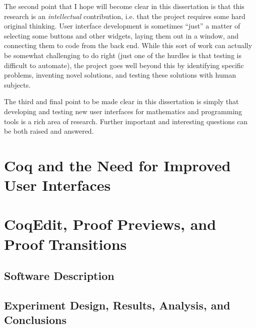 \documentclass[phd,appendix]{uithesis}
\begin{document}
The second point that I hope will become clear in this dissertation is that this research is an \textit{intellectual} contribution, i.e. that the project requires some hard original thinking.  User interface development is sometimes ``just'' a matter of selecting some buttons and other widgets, laying them out in a window, and connecting them to code from the back end.  While this sort of work can actually be somewhat challenging to do right (just one of the hurdles is that testing is difficult to automate), the project goes well beyond this by identifying specific problems, inventing novel solutions, and testing these solutions with human subjects.

The third and final point to be made clear in this dissertation is simply that developing and testing new user interfaces for mathematics and programming tools is a rich area of research.  Further important and interesting questions can be both raised and answered.


\chapter{Coq and the Need for Improved User Interfaces}
\label{chapter:coqandtheneed}
% 

\chapter{CoqEdit, Proof Previews, and Proof Transitions}
\label{chapter:coqedit}

\section{Software Description}

\section{Experiment Design, Results, Analysis, and Conclusions}
\end{document}
